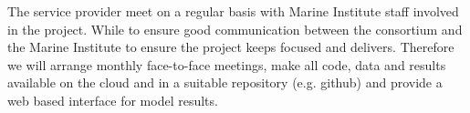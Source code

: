 

The service provider meet on a regular basis with Marine Institute staff involved in the project. While to ensure good communication between the consortium and the Marine Institute to ensure the project keeps focused and delivers. Therefore we will arrange monthly face-to-face meetings, make all code, data and results available on the cloud and in a suitable repository (e.g. github) and provide a web based interface for model results.\\


